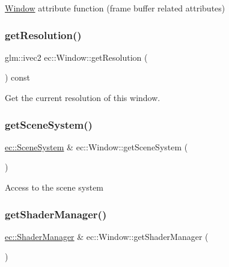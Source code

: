 \mbox{\hyperlink{classec_1_1_window}{Window}} attribute function (frame buffer related attributes) \mbox{\label{classec_1_1_window_a6ae374e668f695a5388f03e2ab6d0b58}} 
\subsubsection{\texorpdfstring{get\+Resolution()}{getResolution()}}
{\footnotesize\ttfamily glm\+::ivec2 ec\+::\+Window\+::get\+Resolution (\begin{DoxyParamCaption}{ }\end{DoxyParamCaption}) const}

Get the current resolution of this window. \mbox{\label{classec_1_1_window_a13d8cba249c2de0a5366c2507e887290}} 
\subsubsection{\texorpdfstring{get\+Scene\+System()}{getSceneSystem()}}
{\footnotesize\ttfamily \mbox{\hyperlink{classec_1_1_scene_system}{ec\+::\+Scene\+System}} \& ec\+::\+Window\+::get\+Scene\+System (\begin{DoxyParamCaption}{ }\end{DoxyParamCaption})}

Access to the scene system \mbox{\label{classec_1_1_window_adc63f54684ad3681c0d4bea8481b6322}} 
\subsubsection{\texorpdfstring{get\+Shader\+Manager()}{getShaderManager()}}
{\footnotesize\ttfamily \mbox{\hyperlink{classec_1_1_shader_manager}{ec\+::\+Shader\+Manager}} \& ec\+::\+Window\+::get\+Shader\+Manager (\begin{DoxyParamCaption}{ }\end{DoxyParamCaption})}


